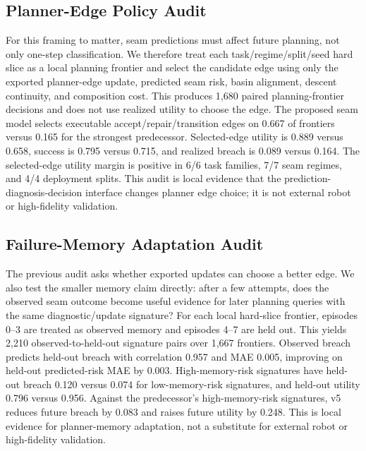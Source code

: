 \documentclass{article}
\begin{document}
\subsection{Planner-Edge Policy Audit}
For this framing to matter, seam predictions must affect future planning, not only one-step classification. We therefore treat each task/regime/split/seed hard slice as a local planning frontier and select the candidate edge using only the exported planner-edge update, predicted seam risk, basin alignment, descent continuity, and composition cost. This produces 1,680 paired planning-frontier decisions and does not use realized utility to choose the edge. The proposed seam model selects executable accept/repair/transition edges on 0.667 of frontiers versus 0.165 for the strongest predecessor. Selected-edge utility is 0.889 versus 0.658, success is 0.795 versus 0.715, and realized breach is 0.089 versus 0.164. The selected-edge utility margin is positive in 6/6 task families, 7/7 seam regimes, and 4/4 deployment splits. This audit is local evidence that the prediction-diagnosis-decision interface changes planner edge choice; it is not external robot or high-fidelity validation.
\begin{center}\small\resizebox{\linewidth}{!}{}\end{center}
\subsection{Failure-Memory Adaptation Audit}
The previous audit asks whether exported updates can choose a better edge. We also test the smaller memory claim directly: after a few attempts, does the observed seam outcome become useful evidence for later planning queries with the same diagnostic/update signature? For each local hard-slice frontier, episodes 0--3 are treated as observed memory and episodes 4--7 are held out. This yields 2,210 observed-to-held-out signature pairs over 1,667 frontiers. Observed breach predicts held-out breach with correlation 0.957 and MAE 0.005, improving on held-out predicted-risk MAE by 0.003. High-memory-risk signatures have held-out breach 0.120 versus 0.074 for low-memory-risk signatures, and held-out utility 0.796 versus 0.956. Against the predecessor's high-memory-risk signatures, v5 reduces future breach by 0.083 and raises future utility by 0.248. This is local evidence for planner-memory adaptation, not a substitute for external robot or high-fidelity validation.
\begin{center}\small\resizebox{\linewidth}{!}{}\end{center}
\end{document}
